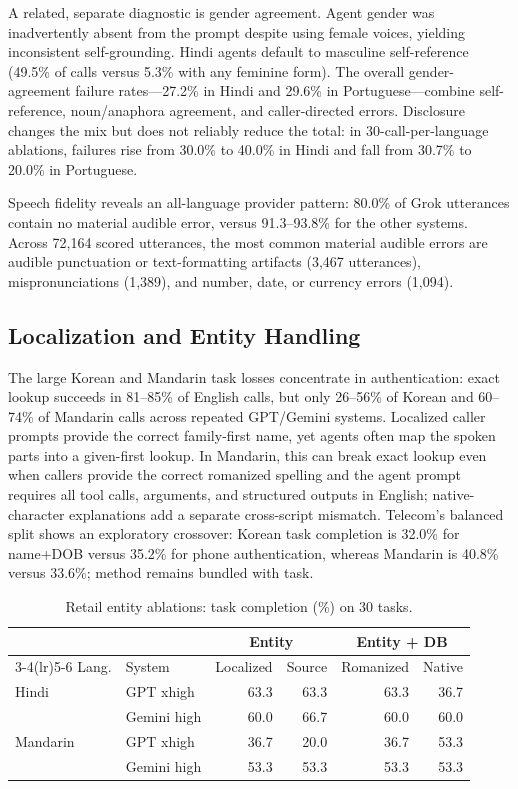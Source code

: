 \documentclass{article}
\begin{document}
A related, separate diagnostic is gender agreement. Agent gender was
inadvertently absent from the prompt despite using female voices, yielding
inconsistent self-grounding. Hindi
agents default to masculine self-reference (49.5\% of calls versus 5.3\% with
any feminine form). The overall gender-agreement failure rates---27.2\% in
Hindi and 29.6\% in Portuguese---combine self-reference, noun/anaphora
agreement, and caller-directed errors. Disclosure changes the mix but does not
reliably reduce the total: in 30-call-per-language ablations, failures rise from
30.0\% to 40.0\% in Hindi and fall from 30.7\% to 20.0\% in Portuguese.

Speech fidelity reveals an all-language provider pattern: 80.0\% of
Grok utterances contain no material audible error, versus 91.3--93.8\% for the
other systems. Across 72,164 scored utterances, the most common material audible
errors are audible punctuation or text-formatting artifacts (3,467 utterances),
mispronunciations (1,389), and number, date, or currency errors (1,094).


\subsection{Localization and Entity Handling}
\label{sec:results-localization}

The large Korean and Mandarin task losses concentrate in
authentication: exact lookup succeeds in 81--85\% of English calls, but only
26--56\% of Korean and 60--74\% of Mandarin calls across repeated GPT/Gemini
systems. Localized caller prompts provide the correct family-first name, yet
agents often map the spoken parts into a given-first lookup. In Mandarin, this
can break exact lookup even when callers provide the correct romanized spelling
and the agent prompt requires all tool calls, arguments, and structured outputs
in English; native-character explanations add a separate cross-script
mismatch. Telecom's
balanced split shows an exploratory crossover:
Korean task completion is 32.0\% for name+DOB versus 35.2\% for phone
authentication, whereas Mandarin is 40.8\% versus 33.6\%; method remains bundled
with task.


\begin{table}[H]
\caption{Retail entity ablations: task completion (\%) on 30 tasks.}
\label{tab:retail-ablations}
\centering
\small
\setlength{\tabcolsep}{1pt}
\renewcommand{\arraystretch}{0.86}
\begin{tabular*}{\columnwidth}{@{\extracolsep{\fill}}llrrrr@{}}
\toprule
& & \multicolumn{2}{c}{Entity} & \multicolumn{2}{c}{Entity + DB} \\
\cmidrule(lr){3-4}\cmidrule(lr){5-6}
Lang. & System & Localized & Source & Romanized & Native \\
\midrule
Hindi & GPT xhigh & 63.3 & 63.3 & 63.3 & 36.7 \\
 & Gemini high & 60.0 & 66.7 & 60.0 & 60.0 \\
Mandarin & GPT xhigh & 36.7 & 20.0 & 36.7 & 53.3 \\
 & Gemini high & 53.3 & 53.3 & 53.3 & 53.3 \\
\bottomrule
\end{tabular*}
\end{table}
\end{document}
